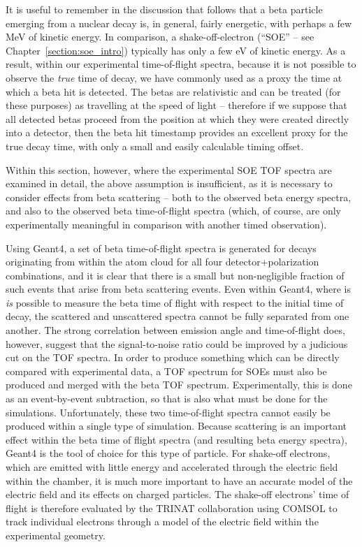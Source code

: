 It is useful to remember in the discussion that follows that a beta particle emerging from a nuclear decay is, in general, fairly energetic, with perhaps a few MeV of kinetic energy.  In comparison, a shake-off-electron (``SOE'' -- see Chapter~\ref{section:soe_intro}) typically has only a few eV of kinetic energy.   As a result, within our experimental time-of-flight spectra, because it is not possible to observe the \emph{true}  time of decay, we have commonly used as a proxy the time at which a beta hit is detected.  The betas are relativistic and can be treated (for these purposes) as travelling at the speed of light -- therefore if we suppose that all detected betas proceed from the position at which they were created directly into a detector, then the beta hit timestamp provides an excellent proxy for the true decay time, with only a small and easily calculable timing offset.  

Within this section, however, where the experimental SOE TOF spectra are examined in detail, the above assumption is insufficient, as it is necessary to consider effects from beta scattering -- both to the observed beta energy spectra, and also to the observed beta time-of-flight spectra (which, of course, are only experimentally meaningful in comparison with another timed observation).  

Using Geant4, a set of beta time-of-flight spectra is generated for decays originating from within the atom cloud for all four detector+polarization combinations, and it is clear that there is a small but non-negligible fraction of such events that arise from beta scattering events.
Even within Geant4, where is \emph{is} possible to measure the beta time of flight with respect to the initial time of decay, the scattered and unscattered spectra cannot be fully separated from one another.  The strong correlation between emission angle and time-of-flight does, however, suggest that the signal-to-noise ratio could be improved by a judicious cut on the TOF spectra. 
%
In order to produce something which can be directly compared with experimental data, a TOF spectrum for SOEs must also be produced and merged with the beta TOF spectrum.  Experimentally, this is done as an event-by-event subtraction, so that is also what must be done for the simulations.  Unfortunately, these two time-of-flight spectra cannot easily be produced within a single type of simulation.  Because scattering is an important effect within the beta time of flight spectra (and resulting beta energy spectra), Geant4 is the tool of choice for this type of particle.  For shake-off electrons, which are emitted with little energy and accelerated through the electric field within the chamber, it is much more important to have an accurate model of the electric field and its effects on charged particles.  The shake-off electrons' time of flight is therefore evaluated by the TRINAT collaboration using COMSOL to track individual electrons through a model of the electric field within the experimental geometry.   

